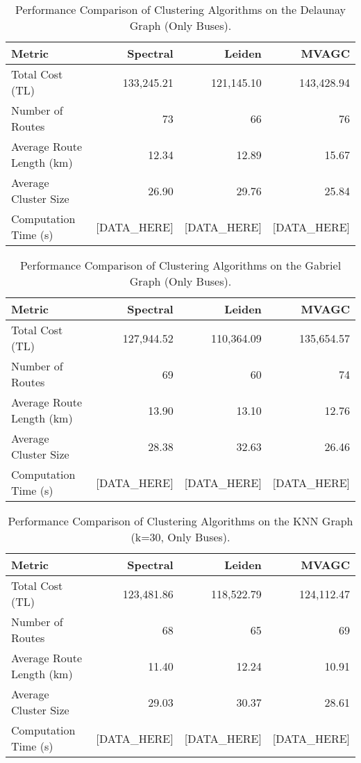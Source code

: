 \begin{table}[h]
\centering
\label{tab:delaunay_results}
\begin{tabular}{lrrr}
\toprule
Metric & Spectral & Leiden & MVAGC \\
\midrule
Total Cost (TL) & 133,245.21 & 121,145.10 & 143,428.94 \\
Number of Routes & 73 & 66 & 76 \\
Average Route Length (km) & 12.34 & 12.89 & 15.67 \\
Average Cluster Size & 26.90 & 29.76 & 25.84 \\
Computation Time (s) & [DATA_HERE] & [DATA_HERE] & [DATA_HERE] \\
\bottomrule
\end{tabular}
\caption{Performance Comparison of Clustering Algorithms on the Delaunay Graph (Only Buses).}
\end{table}

\begin{table}[h]
\centering
\label{tab:gabriel_results}
\begin{tabular}{lrrr}
\toprule
Metric & Spectral & Leiden & MVAGC \\
\midrule
Total Cost (TL) & 127,944.52 & 110,364.09 & 135,654.57 \\
Number of Routes & 69 & 60 & 74 \\
Average Route Length (km) & 13.90 & 13.10 & 12.76 \\
Average Cluster Size & 28.38 & 32.63 & 26.46 \\
Computation Time (s) & [DATA_HERE] & [DATA_HERE] & [DATA_HERE] \\
\bottomrule
\end{tabular}
\caption{Performance Comparison of Clustering Algorithms on the Gabriel Graph (Only Buses).}
\end{table}

\begin{table}[h]
\centering
\label{tab:knn_results}
\begin{tabular}{lrrr}
\toprule
Metric & Spectral & Leiden & MVAGC \\
\midrule
Total Cost (TL) & 123,481.86 & 118,522.79 & 124,112.47 \\
Number of Routes & 68 & 65 & 69 \\
Average Route Length (km) & 11.40 & 12.24 & 10.91 \\
Average Cluster Size & 29.03 & 30.37 & 28.61 \\
Computation Time (s) & [DATA_HERE] & [DATA_HERE] & [DATA_HERE] \\
\bottomrule
\end{tabular}
\caption{Performance Comparison of Clustering Algorithms on the KNN Graph (k=30, Only Buses).}
\end{table}

